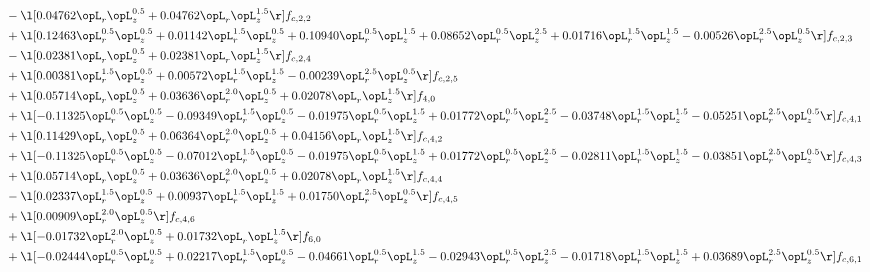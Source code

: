 \begin{alignat}{2}
& - \l[  0.04762 \opL_r \opL_z^{0.5} +  0.04762 \opL_r \opL_z^{1.5}  \r] f_{c,2,2} \nonumber \\ 
& + \l[  0.12463 \opL_r^{0.5} \opL_z^{0.5} +  0.01142 \opL_r^{1.5} \opL_z^{0.5} +  0.10940 \opL_r^{0.5} \opL_z^{1.5} +  0.08652 \opL_r^{0.5} \opL_z^{2.5} +  0.01716 \opL_r^{1.5} \opL_z^{1.5}   -0.00526 \opL_r^{2.5} \opL_z^{0.5}  \r] f_{c,2,3} \nonumber \\ 
& - \l[  0.02381 \opL_r \opL_z^{0.5} +  0.02381 \opL_r \opL_z^{1.5}  \r] f_{c,2,4} \nonumber \\ 
& + \l[  0.00381 \opL_r^{1.5} \opL_z^{0.5} +  0.00572 \opL_r^{1.5} \opL_z^{1.5}   -0.00239 \opL_r^{2.5} \opL_z^{0.5}  \r] f_{c,2,5} \nonumber \\ 
& + \l[  0.05714 \opL_r \opL_z^{0.5} +  0.03636 \opL_r^{2.0} \opL_z^{0.5} +  0.02078 \opL_r \opL_z^{1.5}  \r] f_{4,0} \nonumber \\ 
& + \l[  -0.11325 \opL_r^{0.5} \opL_z^{0.5}   -0.09349 \opL_r^{1.5} \opL_z^{0.5}   -0.01975 \opL_r^{0.5} \opL_z^{1.5} +  0.01772 \opL_r^{0.5} \opL_z^{2.5}   -0.03748 \opL_r^{1.5} \opL_z^{1.5}   -0.05251 \opL_r^{2.5} \opL_z^{0.5}  \r] f_{c,4,1} \nonumber \\ 
& + \l[  0.11429 \opL_r \opL_z^{0.5} +  0.06364 \opL_r^{2.0} \opL_z^{0.5} +  0.04156 \opL_r \opL_z^{1.5}  \r] f_{c,4,2} \nonumber \\ 
& + \l[  -0.11325 \opL_r^{0.5} \opL_z^{0.5}   -0.07012 \opL_r^{1.5} \opL_z^{0.5}   -0.01975 \opL_r^{0.5} \opL_z^{1.5} +  0.01772 \opL_r^{0.5} \opL_z^{2.5}   -0.02811 \opL_r^{1.5} \opL_z^{1.5}   -0.03851 \opL_r^{2.5} \opL_z^{0.5}  \r] f_{c,4,3} \nonumber \\ 
& + \l[  0.05714 \opL_r \opL_z^{0.5} +  0.03636 \opL_r^{2.0} \opL_z^{0.5} +  0.02078 \opL_r \opL_z^{1.5}  \r] f_{c,4,4} \nonumber \\ 
& - \l[  0.02337 \opL_r^{1.5} \opL_z^{0.5} +  0.00937 \opL_r^{1.5} \opL_z^{1.5} +  0.01750 \opL_r^{2.5} \opL_z^{0.5}  \r] f_{c,4,5} \nonumber \\ 
& + \l[  0.00909 \opL_r^{2.0} \opL_z^{0.5}  \r] f_{c,4,6} \nonumber \\ 
& + \l[  -0.01732 \opL_r^{2.0} \opL_z^{0.5} +  0.01732 \opL_r \opL_z^{1.5}  \r] f_{6,0} \nonumber \\ 
& + \l[  -0.02444 \opL_r^{0.5} \opL_z^{0.5} +  0.02217 \opL_r^{1.5} \opL_z^{0.5}   -0.04661 \opL_r^{0.5} \opL_z^{1.5}   -0.02943 \opL_r^{0.5} \opL_z^{2.5}   -0.01718 \opL_r^{1.5} \opL_z^{1.5} +  0.03689 \opL_r^{2.5} \opL_z^{0.5}  \r] f_{c,6,1} \nonumber \\ 

\end{alignat}
